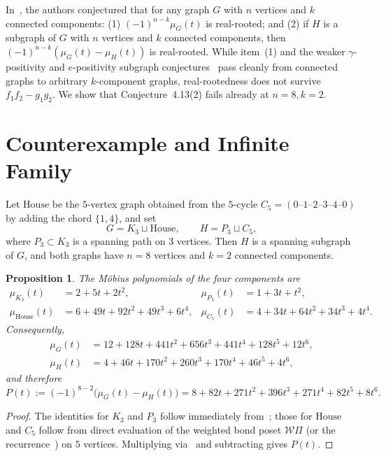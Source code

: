 \documentclass[11pt]{article}
\newtheorem{proposition}[theorem]{Proposition}
\theoremstyle{remark}
\begin{document}
In~\cite[Conjecture~4.13]{GDW2026}, the authors conjectured that for any graph $G$ with $n$ vertices and $k$ connected components: (1) $(-1)^{n-k}\mu_G(t)$ is real-rooted; and (2) if $H$ is a subgraph of $G$ with $n$ vertices and $k$ connected components, then $(-1)^{n-k}(\mu_G(t) - \mu_H(t))$ is real-rooted. While item~(1) and the weaker $\gamma$-positivity and $e$-positivity subgraph conjectures~\cite[Conjectures~4.12(2) and~6.21(2)]{GDW2026} pass cleanly from connected graphs to arbitrary $k$-component graphs, real-rootedness does not survive $f_1 f_2 - g_1 g_2$. We show that Conjecture~4.13(2) fails already at $n = 8, k = 2$.

\section{Counterexample and Infinite Family}

Let $\mathrm{House}$ be the $5$-vertex graph obtained from the $5$-cycle $C_5 = (0\text{--}1\text{--}2\text{--}3\text{--}4\text{--}0)$ by adding the chord $\{1, 4\}$, and set
\[
  G = K_3 \sqcup \mathrm{House}, \qquad H = P_3 \sqcup C_5,
\]
where $P_3 \subset K_3$ is a spanning path on $3$ vertices. Then $H$ is a spanning subgraph of $G$, and both graphs have $n = 8$ vertices and $k = 2$ connected components.

\begin{proposition}\label{prop:components}
The M\"obius polynomials of the four components are
\begin{align*}
  \mu_{K_3}(t) &= 2 + 5t + 2t^2, &
  \mu_{P_3}(t) &= 1 + 3t + t^2, \\
  \mu_{\mathrm{House}}(t) &= 6 + 49t + 92t^2 + 49t^3 + 6t^4, &
  \mu_{C_5}(t) &= 4 + 34t + 64t^2 + 34t^3 + 4t^4.
\end{align*}
Consequently,
\begin{align*}
  \mu_G(t) &= 12 + 128t + 441t^2 + 656t^3 + 441t^4 + 128t^5 + 12t^6, \\
  \mu_H(t) &= 4 + 46t + 170t^2 + 260t^3 + 170t^4 + 46t^5 + 4t^6,
\end{align*}
and therefore
\[
  P(t) := (-1)^{8-2}\bigl(\mu_G(t) - \mu_H(t)\bigr) = 8 + 82t + 271t^2 + 396t^3 + 271t^4 + 82t^5 + 8t^6.
\]
\end{proposition}

\begin{proof}
The identities for $K_3$ and $P_3$ follow immediately from~\cite[Eq.~(3.4) and Theorem~3.2]{GDW2026}; those for $\mathrm{House}$ and $C_5$ follow from direct evaluation of the weighted bond poset $\mathcal{W}\Pi$ (or the recurrence~\cite[Theorem~3.1]{GDW2026}) on $5$ vertices. Multiplying via~\cite[Proposition~2.2]{GDW2026} and subtracting gives $P(t)$.
\end{proof}
\end{document}
